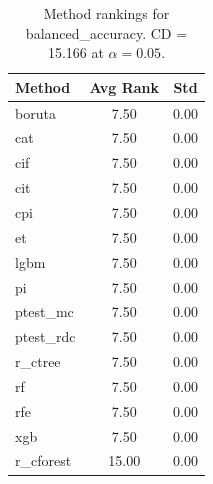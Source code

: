 \begin{table}[h]
\centering
\caption{Method rankings for balanced_accuracy. CD = 15.166 at $\alpha=0.05$.}
\label{tab:ranks_balanced_accuracy}
\begin{tabular}{lcc}
\toprule
Method & Avg Rank & Std \\
\midrule
boruta & 7.50 & 0.00 \\
cat & 7.50 & 0.00 \\
cif & 7.50 & 0.00 \\
cit & 7.50 & 0.00 \\
cpi & 7.50 & 0.00 \\
et & 7.50 & 0.00 \\
lgbm & 7.50 & 0.00 \\
pi & 7.50 & 0.00 \\
ptest_mc & 7.50 & 0.00 \\
ptest_rdc & 7.50 & 0.00 \\
r_ctree & 7.50 & 0.00 \\
rf & 7.50 & 0.00 \\
rfe & 7.50 & 0.00 \\
xgb & 7.50 & 0.00 \\
r_cforest & 15.00 & 0.00 \\
\bottomrule
\end{tabular}
\end{table}